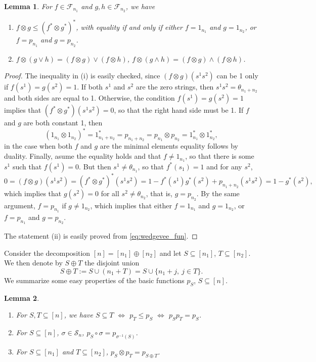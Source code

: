 \documentclass[12pt]{article}
\newtheorem{lemma}{Lemma}
\theoremstyle{definition}
\theoremstyle{remark}
\def\Fe{\mathcal F}
\def\permut{\mathscr{S}}
\begin{document}
\begin{lemma}\label{lemma:fproduct} For $f\in \Fe_{n_1}$ and  $g,h\in \Fe_{n_2}$, we have
\begin{enumerate}
\item[(i)] $f\otimes g\le (f^*\otimes g^*)^*$, with equality if and only if either
$f=1_{n_1}$ and $g=1_{n_2}$, or $f=p_{n_1}$ and $g=p_{n_2}$.
\item[(ii)] $f\otimes (g\vee h)= (f\otimes g)\vee (f\otimes h)$, $f\otimes (g\wedge h)=
(f\otimes g)\wedge (f\otimes h)$.
\end{enumerate}

\end{lemma}

\begin{proof} The inequality in (i) is easily  checked, since $(f\otimes g)(s^1s^2)$ can be 1 only if
$f(s^1)=g(s^2)=1$. If both $s^1$ and $s^2$ are the zero strings, then $s^1s^2=\theta_{n_1+n_2}$ and both sides
are equal to 1. Otherwise, the condition $f(s^1)=g(s^2)=1$ implies that $(f^*\otimes
g^*)(s^1s^2)=0$, so that the right hand side must be 1. If $f$ and $g$ are both
constant 1, then 
\[
(1_{n_1}\otimes 1_{n_2})^*=1_{n_1+n_2}^*=p_{n_1+n_2}=p_{n_1}\otimes
p_{n_2}=1_{n_1}^*\otimes 1_{n_2}^*,
\]
in the case when both $f$
and $g$ are the minimal elements equality  follows by
duality. Finally, asume the equality holds and that $f\ne 1_{n_1}$, so that there is some $s^1$ such that 
$f(s^1)=0$. But then $s^1\ne \theta_{n_1}$, so that $f^*(s_1)=1$  and for any $s^2$,
\[
0=(f\otimes g)(s^1s^2)=(f^*\otimes
g^*)^*(s^1s^2)=1-f^*(s^1)g^*(s^2)+p_{n_1+n_2}(s^1s^2)=1-g^*(s^2),
\]
which implies that $g(s^2)=0$ for all $s^2\ne\theta_{n_2}$, that is, $g=p_{n_2}$. By the same argument,
$f=p_{n_1}$ if $g\ne 1_{n_2}$, which implies that either $f=1_{n_1}$ and $g=1_{n_2}$, or
$f=p_{n_1}$ and $g=p_{n_2}$.

The statement (ii) is easily proved from \eqref{eq:wedgevee_fun}.

\end{proof}

Consider the decomposition $[n]=[n_1]\oplus [n_2]$ and let $S\subseteq [n_1]$,
$T\subseteq [n_2]$. We then denote by $S\oplus T$ the disjoint union 
\begin{equation}\label{eq:disu}
S\oplus T:=S\cup (n_1+T)=S\cup\{n_1+j,\ j\in T\}.
\end{equation}
We summarize some easy properties of the basic functions $p_S$, $S\subseteq [n]$.

\begin{lemma}\label{lemma:PSPT}
\begin{enumerate}
\item[(i)] For $S,T\subseteq [n]$, we have $S\subseteq T$ $\iff$ $p_T\le p_S$ $\iff$
$p_Sp_T=p_S$.
\item[(ii)] For $S\subseteq [n]$, $\sigma\in \permut_n$,
$p_S\circ\sigma=p_{\sigma^{-1}(S)}$.
\item[(iii)] For $S\subseteq [n_1]$ and $T\subseteq [n_2]$, $p_S\otimes p_T=p_{S\oplus T}$.

\end{enumerate}
\end{lemma}
\end{document}
